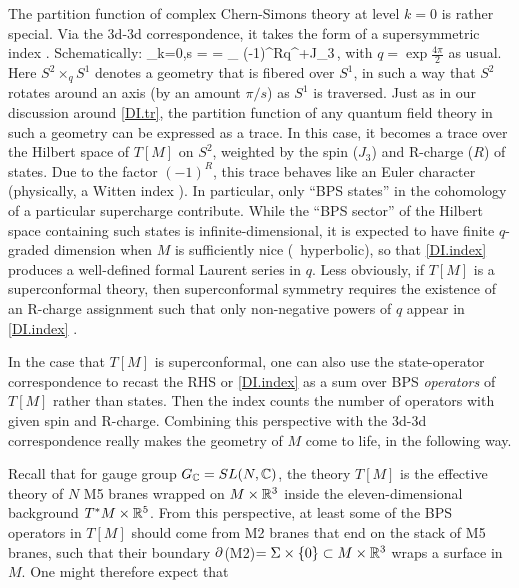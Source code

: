 \documentclass[12pt]{article}
\begin{document}
The partition function of complex Chern-Simons theory at level $k=0$ is rather special. Via the 3d-3d correspondence, it takes the form of a supersymmetric index \cite{DIDGG-index}. Schematically:
%
\DIbe \CalZ[M]_{k=0,s} =  = _{\CalH[\text{$T[M]$ on $S^2$}]} (-1)^Rq^{+J_3}\,, \label{DI.index} \DIee
%
with $q=\exp\frac{4\pi}{2}$ as usual.
Here $S^2\!\times_q\!S^1$ denotes a geometry that is fibered over $S^1$, in such a way that $S^2$ rotates around an axis (by an amount $\pi/s$) as $S^1$ is traversed. Just as in our discussion around \eqref{DI.tr}, the partition function of any quantum field theory in such a geometry can be expressed as a trace. In this case, it becomes a trace over the Hilbert space of $T[M]$ on $S^2$, weighted by the spin ($J_3$) and R-charge ($R$) of states. Due to the factor $(-1)^R$, this trace behaves like an Euler character (physically, a Witten index \cite{DIWitten-constraints}). In particular, only ``BPS states'' in the cohomology of a particular supercharge contribute. While the ``BPS sector'' of the Hilbert space containing such states is infinite-dimensional, it is expected to have finite $q$-graded dimension when $M$ is sufficiently nice (\DIeg\ hyperbolic), so that \eqref{DI.index} produces a well-defined formal Laurent series in $q$.
Less obviously, if $T[M]$ is a superconformal theory, then superconformal symmetry requires the existence of an R-charge assignment such that only non-negative powers of $q$ appear in \eqref{DI.index} \cite{DIDGG-index}.

In the case that $T[M]$ is superconformal, one can also use the state-operator correspondence to recast the RHS or \eqref{DI.index} as a sum over BPS \emph{operators} of $T[M]$ rather than states.
Then the index counts the number of operators with given spin and R-charge. 
Combining this perspective with the 3d-3d correspondence really makes the geometry of $M$ come to life, in the following way. 


Recall that for gauge group $G_{\mathbb C}=SL(N,{\mathbb C})$, the theory $T[M]$ is the effective theory of $N$ M5 branes wrapped on $M\times {\mathbb R}^3$ inside the eleven-dimensional background $T^*M\times {\mathbb R}^5$. From this perspective, at least some of the BPS operators in $T[M]$ should come from M2 branes that end on the stack of M5 branes, such that their boundary $\partial$(M2)$=\Sigma\times\{0\} \subset M\times {\mathbb R}^3$ wraps a surface in $M$. One might therefore expect that
%
\DIbe {} \label{DI.counts} \DIee
\end{document}
